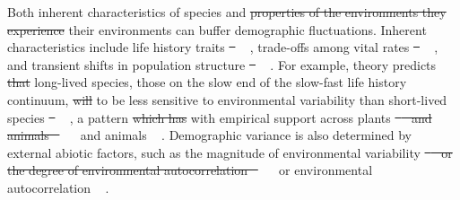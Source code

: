 \documentclass[lineno, sn-basic]{sn-jnl}%
\providecommand{\DIFadd}[1]{{\protect\color{blue}#1}} %
\providecommand{\DIFdel}[1]{{\protect\color{red}\protect\scriptsize\sout{#1}}}
\providecommand{\DIFadd}[1]{{\protect\color{blue}\uwave{#1}}} %
\providecommand{\DIFdel}[1]{{\protect\color{red}\sout{#1}}}                      %
\providecommand{\DIFaddbegin}{} %
\providecommand{\DIFaddend}{} %
\providecommand{\DIFdelbegin}{} %
\providecommand{\DIFdelend}{} %
\newcommand{\DIFscaledelfig}{0.5}
\newlength{\DIFdelgraphicswidth} %
\newlength{\DIFdelgraphicsheight} %
\newcommand{\DIFaddincludegraphics}[2][]{{\color{blue}\fbox{\DIFOincludegraphics[#1]{#2}}}} %
\newcommand{\DIFdelincludegraphics}[2][]{%
\sbox{\DIFdelgraphicsbox}{\DIFOincludegraphics[#1]{#2}}%
\settoboxwidth{\DIFdelgraphicswidth}{\DIFdelgraphicsbox} %
\settoboxtotalheight{\DIFdelgraphicsheight}{\DIFdelgraphicsbox} %
\scalebox{\DIFscaledelfig}{%
\parbox[b]{\DIFdelgraphicswidth}{\usebox{\DIFdelgraphicsbox}\\[-\baselineskip] \rule{\DIFdelgraphicswidth}{0em}}\llap{\resizebox{\DIFdelgraphicswidth}{\DIFdelgraphicsheight}{%
\setlength{\unitlength}{\DIFdelgraphicswidth}%
\begin{picture}(1,1)%
\thicklines\linethickness{2pt} %
{\color[rgb]{1,0,0}\put(0,0){\framebox(1,1){}}}%
{\color[rgb]{1,0,0}\put(0,0){\line( 1,1){1}}}%
{\color[rgb]{1,0,0}\put(0,1){\line(1,-1){1}}}%
\end{picture}%
}\hspace*{3pt}}} %
} %
\DeclareRobustCommand{\DIFaddbegin}{\DIFOaddbegin \let\includegraphics\DIFaddincludegraphics} %
\DeclareRobustCommand{\DIFaddend}{\DIFOaddend \let\includegraphics\DIFOincludegraphics} %
\DeclareRobustCommand{\DIFdelbegin}{\DIFOdelbegin \let\includegraphics\DIFdelincludegraphics} %
\DeclareRobustCommand{\DIFdelend}{\DIFOaddend \let\includegraphics\DIFOincludegraphics} %
\begin{document}
Both inherent characteristics of species and \DIFdelbegin \DIFdel{properties of the environments they experience }\DIFdelend \DIFaddbegin \DIFadd{their environments }\DIFaddend can buffer demographic fluctuations. 
Inherent characteristics include life history traits \DIFdelbegin \DIFdel{\mbox{%
\cite{pfister1998patterns}}\hspace{0pt}%
}\DIFdelend \DIFaddbegin \DIFadd{\mbox{%
\citep{pfister1998patterns}}\hspace{0pt}%
}\DIFaddend , trade-offs among vital rates \DIFdelbegin \DIFdel{\mbox{%
\cite{compagnoni2016effect}}\hspace{0pt}%
}\DIFdelend \DIFaddbegin \DIFadd{\mbox{%
\citep{compagnoni2016effect}}\hspace{0pt}%
}\DIFaddend , and transient shifts in population structure \DIFdelbegin \DIFdel{\mbox{%
\cite{ellis2013role}}\hspace{0pt}%
}\DIFdelend \DIFaddbegin \DIFadd{\mbox{%
\citep{ellis2013role}}\hspace{0pt}%
}\DIFaddend . 
For example, theory predicts \DIFdelbegin \DIFdel{that }\DIFdelend long-lived species, those on the slow end of the slow-fast life history continuum, \DIFdelbegin \DIFdel{will }\DIFdelend \DIFaddbegin \DIFadd{to }\DIFaddend be less sensitive to environmental variability than short-lived species \DIFdelbegin \DIFdel{\mbox{%
\cite{murphy1968pattern}}\hspace{0pt}%
}\DIFdelend \DIFaddbegin \DIFadd{\mbox{%
\citep{murphy1968pattern}}\hspace{0pt}%
}\DIFaddend , a pattern \DIFdelbegin \DIFdel{which has }\DIFdelend \DIFaddbegin \DIFadd{with }\DIFaddend empirical support across plants \DIFdelbegin \DIFdel{\mbox{%
\cite{davison2019stochastic,compagnoni2021herbaceous} }\hspace{0pt}%
and animals \mbox{%
\cite{le2022life,morris2008longevity}}\hspace{0pt}%
}\DIFdelend \DIFaddbegin \DIFadd{\mbox{%
\citep{davison2019stochastic,compagnoni2021herbaceous} }\hspace{0pt}%
and animals \mbox{%
\citep{le2022life,morris2008longevity}}\hspace{0pt}%
}\DIFaddend .
Demographic variance is also determined by external abiotic factors, such as the magnitude of environmental variability \DIFdelbegin \DIFdel{\mbox{%
\cite{rodriguez2021limits} }\hspace{0pt}%
or the degree of environmental autocorrelation \mbox{%
\cite{tuljapurkar1980population,fieberg2001stochastic}}\hspace{0pt}%
}\DIFdelend \DIFaddbegin \DIFadd{\mbox{%
\citep{rodriguez2021limits} }\hspace{0pt}%
or environmental autocorrelation \mbox{%
\citep{tuljapurkar1980population,fieberg2001stochastic}}\hspace{0pt}%
}\DIFaddend .
\end{document}
